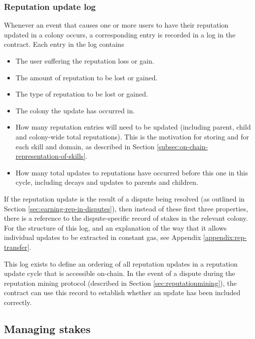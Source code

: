 \subsubsection{Reputation update log}\label{subsec:reputation-update-log}

Whenever an event that causes one or more users to have their reputation updated in a colony occurs, a corresponding entry is recorded in a log in the  contract. Each entry in the log contains

\begin{itemize}
\item The user suffering the reputation loss or gain.
\item The amount of reputation to be lost or gained.
\item The type of reputation to be lost or gained.
\item The colony the update has occurred in.
\item How many reputation entries will need to be updated (including parent, child and colony-wide total reputations). This is the motivation for storing  and  for each skill and domain, as described in Section \ref{subsec:on-chain-representation-of-skills}.
\item How many total updates to reputations have occurred before this one in this cycle, including decays and updates to parents and children.
\end{itemize}

If the reputation update is the result of a dispute being resolved (as outlined in Section \ref{sec:earning-rep-in-disputes}), then instead of these first three properties, there is a reference to the dispute-specific record of stakes in the relevant colony. For the structure of this log, and an explanation of the way that it allows individual updates to be extracted in constant gas, see Appendix \ref{appendix:rep-transfer}.

This log exists to define an ordering of all reputation updates in a reputation update cycle that is accessible on-chain. In the event of a dispute during the reputation mining protocol (described in Section \ref{sec:reputationmining}), the  contract can use this record to establish whether an update has been included correctly.

\subsection{Managing stakes}\label{sec:stakes}


